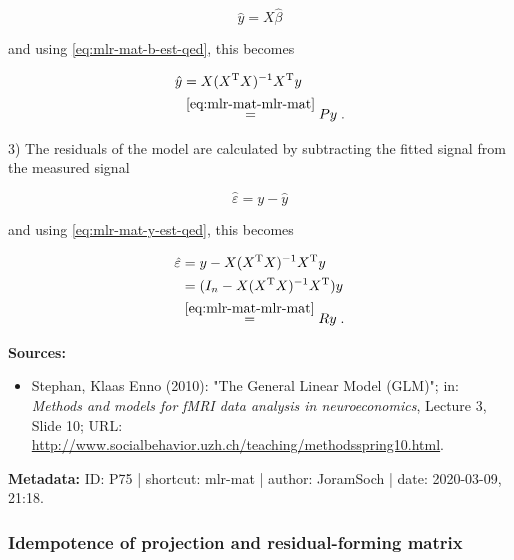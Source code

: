 \documentclass[a4paper,12pt,twoside]{book}
\begin{document}
\begin{equation} \label{eq:mlr-mat-y-est}
\hat{y} = X\hat{\beta}
\end{equation}

and using \eqref{eq:mlr-mat-b-est-qed}, this becomes

\begin{equation} \label{eq:mlr-mat-y-est-qed}
\begin{split}
\hat{y} &= X (X^\mathrm{T} X)^{-1} X^\mathrm{T} y \\
&\overset{\eqref{eq:mlr-mat-mlr-mat}}{=} P y \; .
\end{split}
\end{equation}

\vspace{1em}
3) The residuals of the model are calculated by subtracting the fitted signal from the measured signal

\begin{equation} \label{eq:mlr-mat-e-est}
\hat{\varepsilon} = y - \hat{y}
\end{equation}

and using \eqref{eq:mlr-mat-y-est-qed}, this becomes

\begin{equation} \label{eq:mlr-mat-e-est-qed}
\begin{split}
\hat{\varepsilon} &= y - X (X^\mathrm{T} X)^{-1} X^\mathrm{T} y \\
&= (I_n - X (X^\mathrm{T} X)^{-1} X^\mathrm{T}) y \\
&\overset{\eqref{eq:mlr-mat-mlr-mat}}{=} R y \; .
\end{split}
\end{equation}


\vspace{1em}
\textbf{Sources:}
\begin{itemize}
\item Stephan, Klaas Enno (2010): "The General Linear Model (GLM)"; in: \textit{Methods and models for fMRI data analysis in neuroeconomics}, Lecture 3, Slide 10; URL: \url{http://www.socialbehavior.uzh.ch/teaching/methodsspring10.html}.
\end{itemize}


\vspace{1em}
\textbf{Metadata:} ID: P75 | shortcut: mlr-mat | author: JoramSoch | date: 2020-03-09, 21:18.
\vspace{1em}



\subsubsection[\textbf{Idempotence of projection and residual-forming matrix}]{Idempotence of projection and residual-forming matrix} \label{sec:mlr-idem}
\setcounter{equation}{0}
\end{document}
